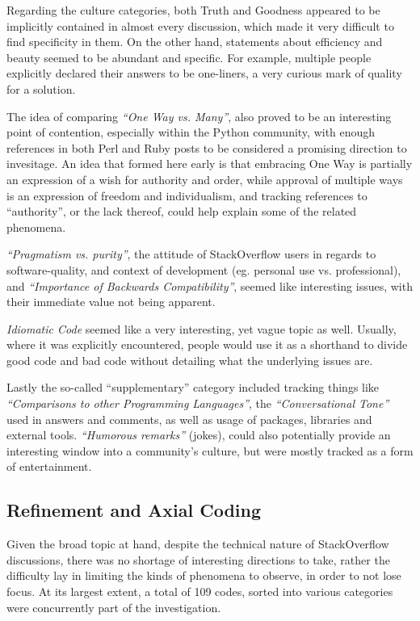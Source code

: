Regarding the culture categories, both Truth and Goodness appeared to be implicitly contained in almost every discussion,
which made it very difficult to find specificity in them. On the other hand, statements about efficiency and beauty seemed
to be abundant and specific. For example, multiple people explicitly declared their answers to be one-liners, a very
curious mark of quality for a solution.

The idea of comparing \textit{“One Way vs. Many”}, also proved to be an interesting point of contention, especially within the
Python community, with enough references in both Perl and Ruby posts to be considered a promising direction to invesitage.
An idea that formed here early is that embracing One Way is partially an expression of a wish for authority and order, while approval
of multiple ways is an expression of freedom and individualism, and tracking references to “authority”, or the lack
thereof, could help explain some of the related phenomena.

\textit{“Pragmatism vs. purity”}, the attitude of StackOverflow users in regards to software-quality, and context of development
(eg. personal use vs. professional), and \textit{“Importance of Backwards Compatibility”}, seemed like interesting issues, with their
immediate value not being apparent.

\textit{Idiomatic Code} seemed like a very interesting, yet vague topic as well. Usually, where it was explicitly encountered,
people would use it as a shorthand to divide good code and bad code without detailing what the underlying issues are.

Lastly the so-called “supplementary” category included tracking things like \textit{“Comparisons to other Programming Languages”},
the \textit{“Conversational Tone”} used in answers and comments, as well as usage of packages, libraries and external tools.
\textit{“Humorous remarks”} (jokes), could also potentially provide an interesting window into a community’s culture, but were
mostly tracked as a form of entertainment.

\subsection{Refinement and Axial Coding}

Given the broad topic at hand, despite the technical nature of StackOverflow discussions, there was no shortage of
interesting directions to take, rather the difficulty lay in limiting the kinds of phenomena to observe, in order to
not lose focus. At its largest extent, a total of 109 codes, sorted into various categories were concurrently part
of the investigation. \cite[data/coding\_system]{thesis_repo}

